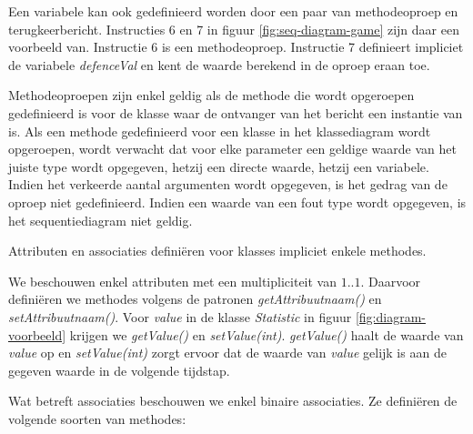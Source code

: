 Een variabele kan ook gedefinieerd worden door een paar van methodeoproep en terugkeerbericht. Instructies 6 en 7 in figuur \ref{fig:seq-diagram-game} zijn daar een voorbeeld van. Instructie 6 is een methodeoproep. Instructie 7 definieert impliciet de variabele \textit{defenceVal} en kent de waarde berekend in de oproep eraan toe.

Methodeoproepen zijn enkel geldig als de methode die wordt opgeroepen gedefinieerd is voor de klasse waar de ontvanger van het bericht een instantie van is. Als een methode gedefinieerd voor een klasse in het klassediagram wordt opgeroepen, wordt verwacht dat voor elke parameter een geldige waarde van het juiste type wordt opgegeven, hetzij een directe waarde, hetzij een variabele. Indien het verkeerde aantal argumenten wordt opgegeven, is het gedrag van de oproep niet gedefinieerd. Indien een waarde van een fout type wordt opgegeven, is het sequentiediagram niet geldig.

Attributen en associaties defini\"eren voor klasses impliciet enkele methodes. 

We beschouwen enkel attributen met een multipliciteit van $1..1$. Daarvoor defini\"eren we methodes volgens de patronen \textit{getAttribuutnaam()} en \textit{setAttribuutnaam()}. Voor \textit{value} in de klasse \textit{Statistic} in figuur \ref{fig:diagram-voorbeeld} krijgen we \textit{getValue()} en \textit{setValue(int)}. \textit{getValue()} haalt de waarde van \textit{value} op en \textit{setValue(int)} zorgt ervoor dat de waarde van \textit{value} gelijk is aan de gegeven waarde in de volgende tijdstap.

Wat betreft associaties beschouwen we enkel binaire associaties. Ze defini\"eren de volgende soorten van methodes:

